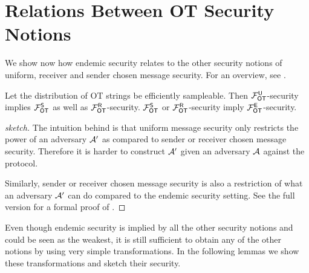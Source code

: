 \section{Relations Between OT Security Notions}\label{sec:relot}

We show now how endemic security relates to the other security notions of uniform, receiver and sender chosen message security. For an overview, see .
\begin{lemma}\label{lemma:is_a}
Let the distribution of OT strings be efficiently sampleable. 
Then $\mathcal{F}_{\mathsf{OT}}^\mathsf{U}$-security implies $\mathcal{F}_{\mathsf{OT}}^{\mathsf{S}}$ as well as $\mathcal{F}_{\mathsf{OT}}^\mathsf{R}$-security. $\mathcal{F}_{\mathsf{OT}}^{\mathsf{S}}$ or $\mathcal{F}_{\mathsf{OT}}^\mathsf{R}$-security imply $\mathcal{F}_{\mathsf{OT}}^\mathsf{E}$-security.
\end{lemma}

\iffullversion

\else
\begin{proof}[sketch]
	The intuition behind   is that uniform message security only restricts the power of an adversary $\mathcal{A}'$ as compared to sender or receiver chosen message security. Therefore it is harder to construct $\mathcal{A}'$ given an adversary $\mathcal{A}$ against the protocol.
	
	Similarly, sender or receiver chosen message security is also a restriction of what an adversary $\mathcal{A}'$ can do compared to the endemic security setting. 
	See \iffullversion {} \else the full version \fi for a formal proof of .\pe
\end{proof}
\fi



Even though endemic security is implied by all the other security notions and could be seen as the weakest, it is still sufficient to obtain any of the other notions by using very simple transformations. In the following lemmas we show these transformations and sketch their security.   



